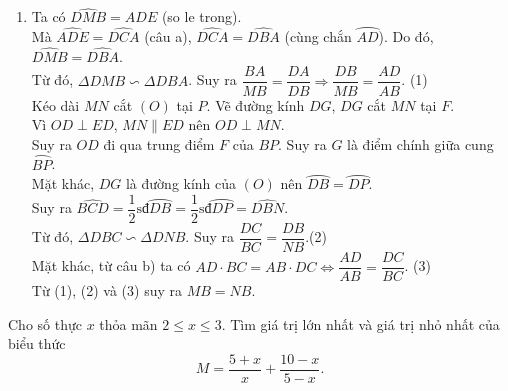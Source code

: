\begin{ex}
{\begin{enumerate}
	\item Ta có $\widehat{DMB}=\widehat{ADE}$ (so le trong).\\
	Mà $\widehat{ADE}=\widehat{DCA}$ (câu a), $\widehat{DCA}=\widehat{DBA}$ (cùng chắn $\wideparen{AD}$). Do đó, $\widehat{DMB}=\widehat{DBA}$. \\
	Từ đó, $\Delta DMB \backsim \Delta DBA$. Suy ra $\dfrac{BA}{MB}=\dfrac{DA}{DB}\Rightarrow \dfrac{DB}{MB}=\dfrac{AD}{AB}$. \hfill (1)\\
	Kéo dài $MN$ cắt $(O)$ tại $P$. Vẽ đường kính $DG$, $DG$ cắt $MN$ tại $F$.\\
	Vì $OD\perp ED$, $MN\parallel ED$ nên $OD\perp MN$.\\
	Suy ra $OD$ đi qua trung điểm $F$ của $BP$. Suy ra $G$ là điểm chính giữa cung $\wideparen{BP}$.\\
	Mặt khác, $DG$ là đường kính của $(O)$ nên $\wideparen{DB}=\wideparen{DP}$. \\
	Suy ra $\widehat{BCD}=\dfrac{1}{2}\text{sđ}\wideparen{DB}=\dfrac{1}{2}\text{sđ}\wideparen{DP}=\widehat{DBN}$.\\
	Từ đó, $\Delta DBC \backsim \Delta DNB$. Suy ra $\dfrac{DC}{BC}=\dfrac{DB}{NB}$.\hfill (2)\\
	Mặt khác, từ câu b) ta có $AD\cdot BC= AB\cdot DC\Leftrightarrow \dfrac{AD}{AB}=\dfrac{DC}{BC}$. \hfill (3)\\
	Từ (1), (2) và (3) suy ra $MB=NB$.
	\end{enumerate}
	}
\end{ex}

\begin{ex}%
	Cho số thực $x$ thỏa mãn $2\leq x\leq 3$. Tìm giá trị lớn nhất và giá trị nhỏ nhất của biểu thức $$M=\dfrac{5+x}{x}+\dfrac{10-x}{5-x}.$$
\end{ex}



